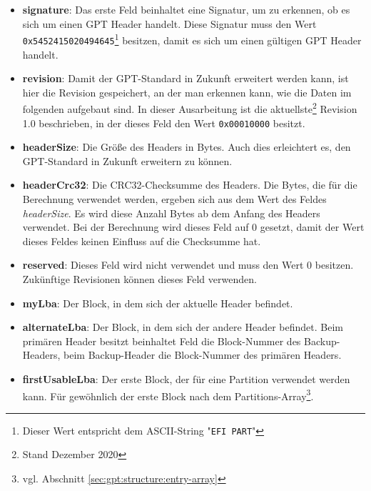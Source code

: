 \newpage
\begin{itemize}
    \item \textbf{signature}: 
    Das erste Feld beinhaltet eine Signatur, um zu erkennen, ob es sich um einen GPT Header handelt.
    Diese Signatur muss den Wert \texttt{0x5452415020494645}\footnote{
        Dieser Wert entspricht dem ASCII-String "\texttt{EFI PART}"
    } 
    besitzen, damit es sich um einen gültigen GPT Header handelt.

    \item \textbf{revision}:
    Damit der GPT-Standard in Zukunft erweitert werden kann, ist hier die Revision gespeichert, an der man erkennen kann, wie die Daten im folgenden aufgebaut sind.
    In dieser Ausarbeitung ist die aktuellste\footnote{
        Stand Dezember 2020
    }
    Revision 1.0 beschrieben, in der dieses Feld den Wert \texttt{0x00010000} besitzt.

    \item \textbf{headerSize}:
    Die Größe des Headers in Bytes.
    Auch dies erleichtert es, den GPT-Standard in Zukunft erweitern zu können.

    \item \textbf{headerCrc32}:
    Die CRC32-Checksumme des Headers.
    Die Bytes, die für die Berechnung verwendet werden, ergeben sich aus dem Wert des Feldes \textit{headerSize}.
    Es wird diese Anzahl Bytes ab dem Anfang des Headers verwendet.
    Bei der Berechnung wird dieses Feld auf 0 gesetzt, damit der Wert dieses Feldes keinen Einfluss auf die Checksumme hat.

    \item \textbf{reserved}:
    Dieses Feld wird nicht verwendet und muss den Wert 0 besitzen. Zukünftige Revisionen können dieses Feld verwenden.

    \item \textbf{myLba}:
    Der Block, in dem sich der aktuelle Header befindet.

    \item \textbf{alternateLba}:
    Der Block, in dem sich der andere Header befindet.
    Beim primären Header besitzt beinhaltet Feld die Block-Nummer des Backup-Headers, beim Backup-Header die Block-Nummer des primären Headers.

    \item \textbf{firstUsableLba}:
    Der erste Block, der für eine Partition verwendet werden kann.
    Für gewöhnlich der erste Block nach dem Partitions-Array\footnote{
        vgl. Abschnitt \ref{sec:gpt:structure:entry-array}
    }.


\end{itemize}
